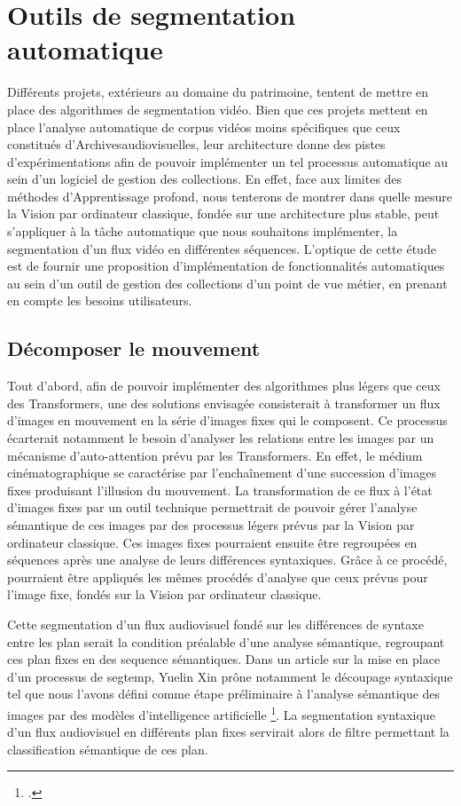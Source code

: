 \section{\label{II_1_B} Outils de segmentation automatique}

Différents projets, extérieurs au domaine du patrimoine, tentent de mettre en place des algorithmes de segmentation vidéo. Bien que ces projets mettent en place l'analyse automatique de corpus vidéos moins spécifiques que ceux constitués d'\gls{Archivesaudiovisuelles}, leur architecture donne des pistes d'expérimentations afin de pouvoir implémenter un tel processus automatique au sein d'un logiciel de gestion des collections. En effet, face aux limites des méthodes d'\gls{Apprentissage profond}, nous tenterons de montrer dans quelle mesure la \gls{Vision par ordinateur} classique, fondée sur une architecture plus stable, peut s'appliquer à la tâche automatique que nous souhaitons implémenter, la segmentation d'un flux vidéo en différentes séquences. L'optique de cette étude est de fournir une proposition d'implémentation de fonctionnalités automatiques au sein d'un outil de gestion des collections d'un point de vue métier, en prenant en compte les besoins utilisateurs.

\subsection{Décomposer le mouvement}

Tout d'abord, afin de pouvoir implémenter des algorithmes plus légers que ceux des \gls{Transformers}, une des solutions envisagée consisterait à transformer un flux d'images en mouvement en la série d'images fixes qui le composent. Ce processus écarterait notamment le besoin d'analyser les relations entre les images par un mécanisme d'auto-attention prévu par les \gls{Transformers}. En effet, le médium cinématographique se caractérise par l'enchaînement d'une succession d'images fixes produisant l'illusion du mouvement. La transformation de ce flux à l'état d'images fixes par un outil technique permettrait de pouvoir gérer l'analyse sémantique de ces images par des processus légers prévus par la \gls{Vision par ordinateur} classique. Ces images fixes pourraient ensuite être regroupées en séquences après une analyse de leurs différences syntaxiques. Grâce à ce procédé, pourraient être appliqués les mêmes procédés d'analyse que ceux prévus pour l'image fixe, fondés sur la \gls{Vision par ordinateur} classique. 

Cette segmentation d'un flux audiovisuel fondé sur les différences de syntaxe entre les \gls{plan} serait la condition préalable d'une analyse sémantique, regroupant ces \gls{plan} fixes en des \gls{sequence} sémantiques. Dans un article sur la mise en place d'un processus de \gls{segtemp}, Yuelin Xin prône notamment le découpage syntaxique tel que nous l'avons défini comme étape préliminaire à l'analyse sémantique des images par des modèles d'intelligence artificielle \footcite{xin2023}. La segmentation syntaxique d'un flux audiovisuel en différents \gls{plan} fixes servirait alors de filtre permettant la classification sémantique de ces \gls{plan}. 

